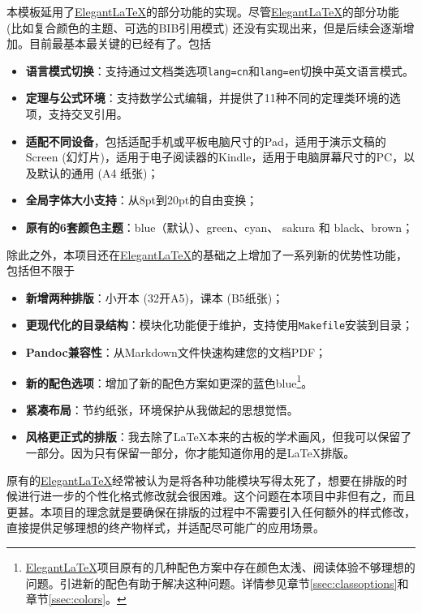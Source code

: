 本模板延用了\href{https://github.com/ElegantLaTeX/}{Elegant\LaTeX}的部分功能的实现。尽管\href{https://github.com/ElegantLaTeX/}{Elegant\LaTeX}的部分功能 (比如复合颜色的主题、可选的BIB引用模式) 还没有实现出来，但是后续会逐渐增加。目前最基本最关键的已经有了。包括
\begin{itemize}
  \item \textbf{语言模式切换}：支持通过文档类选项\texttt{lang=cn}和\texttt{lang=en}切换中英文语言模式。
  \item \textbf{定理与公式环境}：支持数学公式编辑，并提供了11种不同的定理类环境的选项，支持交叉引用。
  \item \textbf{适配不同设备}，包括适配手机或平板电脑尺寸的Pad，适用于演示文稿的Screen (幻灯片)，适用于电子阅读器的Kindle，适用于电脑屏幕尺寸的PC，以及默认的通用 (A4 纸张)；
  \item \textbf{全局字体大小支持}：从8pt到20pt的自由变换；
  \item \textbf{原有的6套颜色主题}：\textcolor{elegantblue}{blue}（默认）、\textcolor{elegantgreen}{green}、\textcolor{elegantcyan}{cyan}、 \textcolor{elegantsakura}{sakura} 和 \textcolor{elegantblack}{black}、\textcolor{elegantbrown}{brown}；
\end{itemize}

除此之外，本项目还在\href{https://github.com/ElegantLaTeX/}{Elegant\LaTeX}的基础之上增加了一系列新的优势性功能，包括但不限于
\begin{itemize}
  \item \textbf{新增两种排版}：小开本 (32开A5)，课本 (B5纸张)；
  \item \textbf{更现代化的目录结构}：模块化功能便于维护，支持使用\texttt{Makefile}安装到目录；
  \item \textbf{Pandoc兼容性}：从Markdown文件快速构建您的文档PDF；
  \item \textbf{新的配色选项}：增加了新的配色方案如更深的蓝色\textcolor{eblue}{blue}\footnote{\href{https://github.com/ElegantLaTeX/}{Elegant\LaTeX}项目原有的几种配色方案中存在颜色太浅、阅读体验不够理想的问题。引进新的配色有助于解决这种问题。详情参见章节\ref{ssec:classoptions}和章节\ref{ssec:colors}。}。
  \item \textbf{紧凑布局}：节约纸张，环境保护从我做起的思想觉悟。
  \item \textbf{风格更正式的排版}：我去除了\LaTeX{}本来的古板的学术画风，但我可以保留了一部分。因为只有保留一部分，你才能知道你用的是\LaTeX{}排版。
\end{itemize}

\begin{remark}
  原有的\href{https://github.com/ElegantLaTeX/}{Elegant\LaTeX}经常被认为是将各种功能模块写得太死了，想要在排版的时候进行进一步的个性化格式修改就会很困难。这个问题在本项目中非但有之，而且更甚。本项目的理念就是要确保在排版的过程中不需要引入任何额外的样式修改，直接提供足够理想的终产物样式，并适配尽可能广的应用场景。
\end{remark}